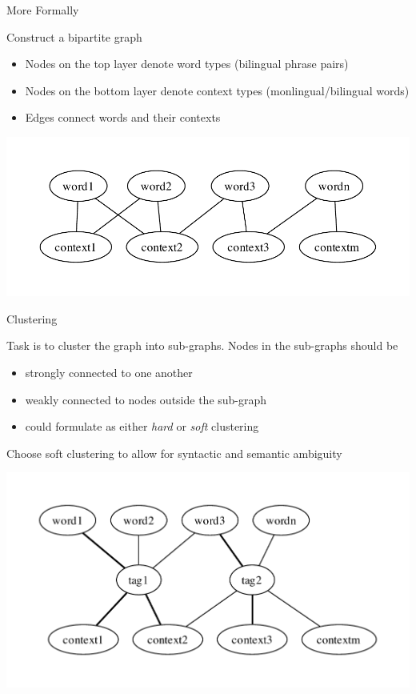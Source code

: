 \documentclass{beamer}
\begin{document}
\begin{frame}[t]{More Formally}

Construct a bipartite graph
\begin{itemize}
    \item Nodes on the top layer denote word types (bilingual phrase pairs)
    \item Nodes on the bottom layer denote context types (monlingual/bilingual words)
    \item Edges connect words and their contexts
\end{itemize}

\includegraphics[width=\columnwidth]{bipartite.pdf}

\end{frame}

\begin{frame}[t]{Clustering}

Task is to cluster the graph into sub-graphs. Nodes in the sub-graphs should be
\begin{itemize}
\item strongly connected to one another
\item weakly connected to nodes outside the sub-graph
\item could formulate as either \emph{hard} or \emph{soft} clustering
\end{itemize}
Choose \alert{soft clustering} to allow for syntactic and semantic ambiguity

\centering
\includegraphics[width=0.7\columnwidth]{bipartite_lda.pdf}

\end{frame}
\end{document}

